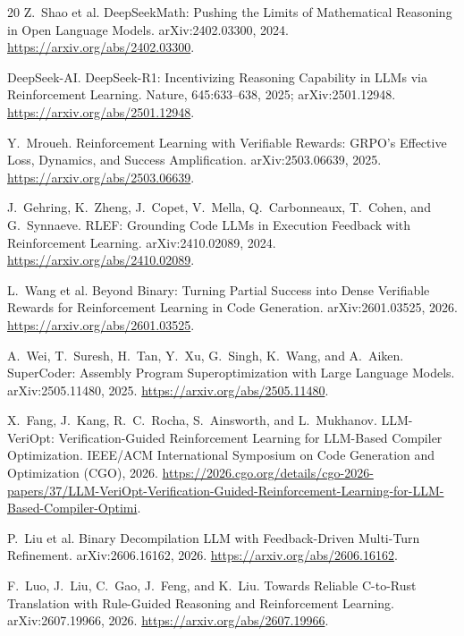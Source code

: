 \documentclass{article}
\begin{document}
\begin{thebibliography}{20}
Z.~Shao et al.
\newblock DeepSeekMath: Pushing the Limits of Mathematical Reasoning in Open Language Models.
\newblock arXiv:2402.03300, 2024.
\newblock \url{https://arxiv.org/abs/2402.03300}.

DeepSeek-AI.
\newblock DeepSeek-R1: Incentivizing Reasoning Capability in LLMs via Reinforcement Learning.
\newblock Nature, 645:633--638, 2025; arXiv:2501.12948.
\newblock \url{https://arxiv.org/abs/2501.12948}.

Y.~Mroueh.
\newblock Reinforcement Learning with Verifiable Rewards: GRPO's Effective Loss, Dynamics, and Success Amplification.
\newblock arXiv:2503.06639, 2025.
\newblock \url{https://arxiv.org/abs/2503.06639}.

J.~Gehring, K.~Zheng, J.~Copet, V.~Mella, Q.~Carbonneaux, T.~Cohen, and G.~Synnaeve.
\newblock RLEF: Grounding Code LLMs in Execution Feedback with Reinforcement Learning.
\newblock arXiv:2410.02089, 2024.
\newblock \url{https://arxiv.org/abs/2410.02089}.

L.~Wang et al.
\newblock Beyond Binary: Turning Partial Success into Dense Verifiable Rewards for Reinforcement Learning in Code Generation.
\newblock arXiv:2601.03525, 2026.
\newblock \url{https://arxiv.org/abs/2601.03525}.

A.~Wei, T.~Suresh, H.~Tan, Y.~Xu, G.~Singh, K.~Wang, and A.~Aiken.
\newblock SuperCoder: Assembly Program Superoptimization with Large Language Models.
\newblock arXiv:2505.11480, 2025.
\newblock \url{https://arxiv.org/abs/2505.11480}.

X.~Fang, J.~Kang, R.~C.~Rocha, S.~Ainsworth, and L.~Mukhanov.
\newblock LLM-VeriOpt: Verification-Guided Reinforcement Learning for LLM-Based Compiler Optimization.
\newblock IEEE/ACM International Symposium on Code Generation and Optimization (CGO), 2026.
\newblock \url{https://2026.cgo.org/details/cgo-2026-papers/37/LLM-VeriOpt-Verification-Guided-Reinforcement-Learning-for-LLM-Based-Compiler-Optimi}.

P.~Liu et al.
\newblock Binary Decompilation LLM with Feedback-Driven Multi-Turn Refinement.
\newblock arXiv:2606.16162, 2026.
\newblock \url{https://arxiv.org/abs/2606.16162}.

F.~Luo, J.~Liu, C.~Gao, J.~Feng, and K.~Liu.
\newblock Towards Reliable C-to-Rust Translation with Rule-Guided Reasoning and Reinforcement Learning.
\newblock arXiv:2607.19966, 2026.
\newblock \url{https://arxiv.org/abs/2607.19966}.


\end{thebibliography}
\end{document}
